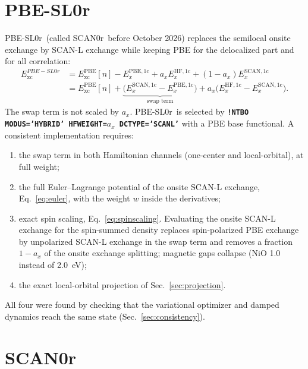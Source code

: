 \documentclass[11pt,a4paper,oneside]{book}
\newcommand{\onec}{\mathrm{1c}}
\newcommand{\scanzero}{SCAN0r}
\newcommand{\pbeslzero}{PBE-SL0r}
\newcommand{\key}[1]{\textbf{\texttt{#1}}}
\begin{document}
\section{\pbeslzero}\label{sec:pbesl0r}

\pbeslzero\ (called \scanzero\ before October 2026) replaces the semilocal
onsite exchange by SCAN-L exchange while keeping PBE for the delocalized
part and for all correlation:
\begin{align}
  E_{\mathrm{xc}}^{\pbeslzero} &= E_{\mathrm{xc}}^{\mathrm{PBE}}[n]
  - E_x^{\mathrm{PBE},\onec}
  + a_x E_x^{\mathrm{HF},\onec} + (1-a_x) E_x^{\mathrm{SCAN},\onec}
  \nonumber\\
  &= E_{\mathrm{xc}}^{\mathrm{PBE}}[n]
  + \underbrace{\bigl(E_x^{\mathrm{SCAN},\onec}-E_x^{\mathrm{PBE},\onec}\bigr)}_{\text{swap term}}
  + a_x\bigl(E_x^{\mathrm{HF},\onec} - E_x^{\mathrm{SCAN},\onec}\bigr).
  \label{eq:pbesl0r}
\end{align}
The swap term is not scaled by $a_x$. \pbeslzero\ is selected by
\key{!NTBO MODUS='HYBRID' HFWEIGHT=$a_x$ DCTYPE='SCANL'} with a PBE base
functional. A consistent implementation requires:
\begin{enumerate}
\item the swap term in both Hamiltonian channels (one-center and
  local-orbital), at full weight;
\item the full Euler--Lagrange potential of the onsite SCAN-L exchange,
  Eq.~\eqref{eq:euler}, with the weight $w$ inside the derivatives;
\item exact spin scaling, Eq.~\eqref{eq:spinscaling}. Evaluating the
  onsite SCAN-L exchange for the spin-summed density replaces
  spin-polarized PBE exchange by unpolarized SCAN-L exchange in the swap
  term and removes a fraction $1-a_x$ of the onsite exchange splitting;
  magnetic gaps collapse (NiO 1.0 instead of 2.0~eV);
\item the exact local-orbital projection of Sec.~\ref{sec:projection}.
\end{enumerate}
All four were found by checking that the variational optimizer and
damped dynamics reach the same state (Sec.~\ref{sec:consistency}).

\section{\scanzero}\label{sec:scan0r}
\end{document}
